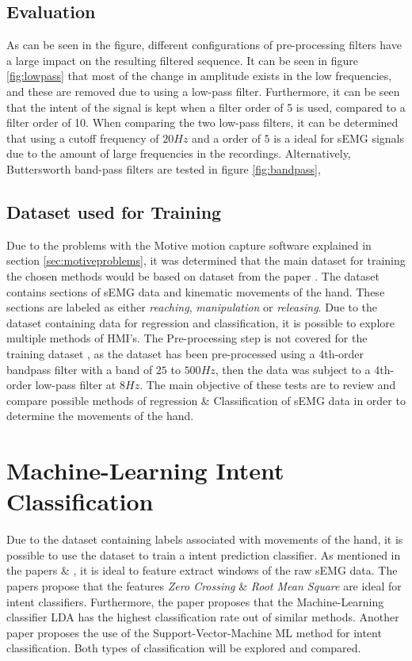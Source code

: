\documentclass[../main.tex]{subfiles}
\begin{document}
\subsection{Evaluation}

As can be seen in the figure, different configurations of pre-processing filters have a large impact on the resulting filtered sequence. 
It can be seen in figure \ref{fig:lowpass} that most of the change in amplitude exists in the low frequencies, and these are removed due to using a low-pass filter.
Furthermore, it can be seen that the intent of the signal is kept when a filter order of 5 is used, compared to a filter order of 10.
When comparing the two low-pass filters, it can be determined that using a cutoff frequency of $20Hz$ and a order of $5$ is a ideal for sEMG signals due to the amount of large frequencies in the recordings.
Alternatively, Buttersworth band-pass filters are tested in figure \ref{fig:bandpass},


\subsection{Dataset used for Training}

Due to the problems with the Motive motion capture software explained in section \ref{sec:motiveproblems}, it was determined that the main dataset for training the chosen methods would be based on dataset \cite{kinmusdataset} from the paper \cite{jarque2019}.
The dataset contains sections of sEMG data and kinematic movements of the hand.
These sections are labeled as either \textit{reaching}, \textit{manipulation} or \textit{releasing}.  
Due to the dataset containing data for regression and classification, it is possible to explore multiple methods of HMI's. 
The Pre-processing step is not covered for the training dataset \cite{kinmusdataset}, as the dataset has been pre-processed using a 4th-order bandpass filter with a band of  $25$ to $500Hz$, then the data was subject to a 4th-order low-pass filter at $8 Hz$.
The main objective of these tests are to review and compare possible methods of regression \& Classification of sEMG data in order to determine the movements of the hand.

\newpage
\section{Machine-Learning Intent Classification}

Due to the dataset containing labels associated with movements of the hand, it is possible to use the dataset to train a intent prediction classifier.
As mentioned in the papers \cite{??} \& \cite{??}, it is ideal to feature extract windows of the raw sEMG data.
The papers propose that the features \textit{Zero Crossing} \& \textit{Root Mean Square} are ideal for intent classifiers.
Furthermore, the paper \cite{??} proposes that the Machine-Learning classifier LDA has the highest classification rate out of similar methods.
Another paper \cite{??} proposes the use of the Support-Vector-Machine ML method for intent  classification.
Both types of classification will be explored and compared.
\end{document}
